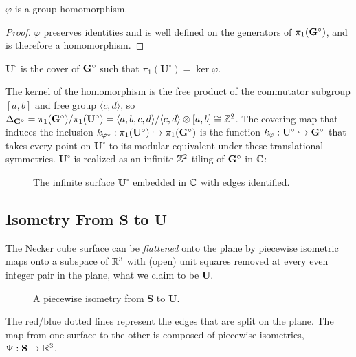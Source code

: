 \documentclass[]{article}
\def\bU{\mathbf{U}} \def\btU{\tilde{\bU}} \def\bUs{\bU^\circ}
\def\<{\langle} \def\>{\rangle}
\begin{document}
\begin{lem}
$\varphi$ is a group homomorphism.
\begin{proof}
$\varphi$ preserves identities and is well defined on the generators of $\pi_1(\mathbf{G}^\circ)$, and is therefore a homomorphism.
\end{proof}
\end{lem}

\begin{Def}
$\bUs$ is the cover of $\mathbf{G}^\circ$ such that $\pi_1(\bUs)=\ker\varphi$.
\end{Def}

The kernel of the homomorphism is the free product of the commutator subgroup $[a,b]$ and free group $\<c,d\>$, so $\Delta_{\bGs}=\pi_1(\bGs)/\pi_1(\bUs)=\<a,b,c,d\>/\<c,d\>\otimes [a,b]\cong\ZZ^2$. The covering map that induces the inclusion $k_{\varphi*}:\pi_1(\bUs)\hookrightarrow\pi_1(\bGs)$ is the function $k_{\varphi}:\bUs\hookrightarrow\bGs$ that takes every point on $\bUs$ to its modular equivalent under these translational symmetries. $\bUs$ is realized as an infinite $\mathbb{Z}^2$-tiling of $\mathbf{G}^\circ$ in $\mathbb{C}$:
\begin{figure}[H]
\centering

\caption{The infinite surface $\bUs$ embedded in $\mathbb{C}$ with edges identified.}
\end{figure} 


\subsection{Isometry From $\mathbf{S}$ to $\bU$}
The Necker cube surface can be \emph{flattened} onto the plane by piecewise isometric maps onto a subspace of $\mathbb{R}^3$ with (open) unit squares removed at every even integer pair in the plane, what we claim to be $\bU$.
\begin{figure}[H]
\centering
 \hspace{0.1in}\raisebox{1.0in}{\text{$\rightarrow$}}\hspace{0.1in}
\raisebox{0.4in}{}
\caption{A piecewise isometry from $\mathbf{S}$ to $\bU$. }
\label{fig:Psi}
\end{figure}
\noindent The red/blue dotted lines represent the edges that are split on the plane. The map from one surface to the other is composed of piecewise isometries, $\Psi:\mathbf{S}\rightarrow\mathbb{R}^3$.
\end{document}
